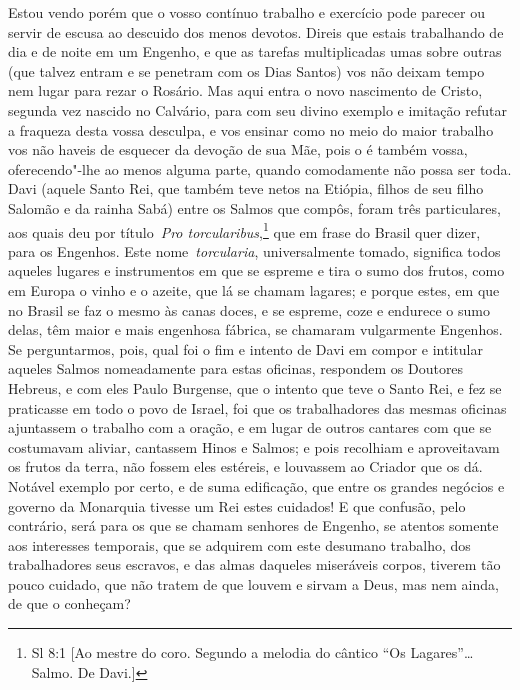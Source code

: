 Estou vendo porém que o vosso contínuo trabalho e exercício
pode parecer ou servir de escusa ao descuido dos menos devotos. Direis
que estais trabalhando de dia e de noite em um Engenho, e que as tarefas
multiplicadas umas sobre outras (que talvez entram e se penetram com os
Dias Santos) vos não deixam tempo nem lugar para rezar o Rosário.
Mas aqui entra o novo nascimento de Cristo, segunda vez nascido no
Calvário, para com seu divino exemplo e imitação refutar a fraqueza
desta vossa desculpa, e vos ensinar como no meio do maior trabalho vos
não haveis de esquecer da devoção de sua Mãe, pois o é também vossa,
oferecendo"-lhe ao menos alguma parte, quando comodamente não possa ser
toda. Davi (aquele Santo Rei, que também teve netos na Etiópia, filhos
de seu filho Salomão e da rainha Sabá) entre os Salmos que compôs, foram
três particulares, aos quais deu por título~\emph{Pro torcularibus},\footnote{Sl 8:1 [Ao mestre do coro. Segundo a melodia do cântico ``Os Lagares''\ldots{} Salmo. De Davi.]} que
em frase do Brasil quer dizer, para os Engenhos. Este
nome~\emph{torcularia}, universalmente tomado, significa todos aqueles
lugares e instrumentos em que se espreme e tira o sumo dos frutos, como
em Europa o vinho e o azeite, que lá se chamam lagares; e porque estes,
em que no Brasil se faz o mesmo às canas doces, e se espreme, coze e
endurece o sumo delas, têm maior e mais engenhosa fábrica, se chamaram
vulgarmente Engenhos. Se perguntarmos, pois, qual foi o fim e intento de
Davi em compor e intitular aqueles Salmos nomeadamente para estas
oficinas, respondem os Doutores Hebreus, e com eles Paulo Burgense, que
o intento que teve o Santo Rei, e fez se praticasse em todo o povo de
Israel, foi que os trabalhadores das mesmas oficinas ajuntassem o
trabalho com a oração, e em lugar de outros cantares com que se
costumavam aliviar, cantassem Hinos e Salmos; e pois recolhiam e
aproveitavam os frutos da terra, não fossem eles estéreis, e louvassem
ao Criador que os dá. Notável exemplo por certo, e de suma edificação,
que entre os grandes negócios e governo da Monarquia tivesse um Rei
estes cuidados! E que confusão, pelo contrário, será para os que se
chamam senhores de Engenho, se atentos somente aos interesses temporais,
que se adquirem com este desumano trabalho, dos trabalhadores seus
escravos, e das almas daqueles miseráveis corpos, tiverem tão pouco
cuidado, que não tratem de que louvem e sirvam a Deus, mas nem ainda, de
que o conheçam?

